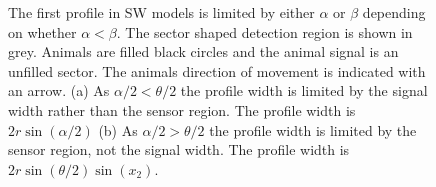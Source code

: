 \begin{figure}[t]
  \centering
{
}
\caption[The first profile in SW models]{
The first profile in SW models is limited by either $\alpha$ or $\beta$ depending on whether $\alpha < \beta$.  
The sector shaped detection region is shown in grey. 
Animals are filled black circles and the animal signal is an unfilled sector. 
The animals direction of movement is indicated with an arrow. 
(a)  As $\alpha/2 < \theta/2$ the profile width is limited by the signal width rather than the sensor region. 
The profile width is $2r\sin\left(\alpha/2\right)$ (b) As $\alpha/2 > \theta/2$ the profile width is limited by the sensor region, not the signal width. 
The profile width is $2r\sin\left(\theta/2\right)\sin(x_2)$.    
}
\label{f:forward}
\end{figure}


